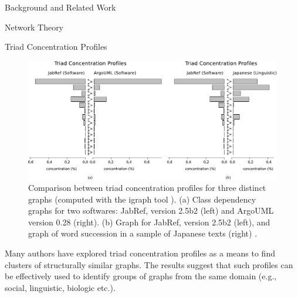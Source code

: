 \documentclass[11pt,twocolumn,a4paper,english]{article}
\begin{document}
\begin{section}{Background and Related Work}
\begin{subsection}{Network Theory}
\begin{subsubsection}{Triad Concentration Profiles}
	\begin{figure}[htbp]
		\centering
			\includegraphics[scale=1]{figures/tcp}
		\caption{Comparison between triad concentration profiles for three distinct graphs (computed with the igraph tool \cite{igraph}). (a) Class dependency graphs for two softwares: JabRef, version 2.5b2 (left) and ArgoUML version 0.28 (right). (b) Graph for JabRef, version 2.5b2 (left), and graph of word succession in a sample of Japanese texts (right) \cite{Milo2004}.}
		\label{fig:tcp}
	\end{figure}

	Many authors \cite{Milo2004,Ma2007,Lin2008} have explored triad concentration profiles as a means to find clusters of structurally similar graphs. The results suggest that such profiles can be effectively used to identify groups of graphs from the same domain (e.g., social, linguistic, biologic etc.).
\end{subsubsection}
	
	
\end{subsection}


\end{section}

\end{document}
